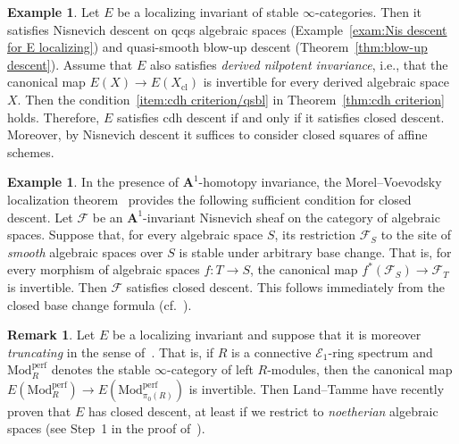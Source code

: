 \documentclass[11pt]{article}
\theoremstyle{definition}
\newtheorem{exam}[theo]{Example}
\newtheorem{rema}[theo]{Remark}
\numberwithin{equation}{section}
\numberwithin{figure}{section}
\numberwithin{table}{section}
\newcommand{\sE}{\ensuremath{\mathcal{E}}\xspace}
\newcommand{\sF}{\ensuremath{\mathcal{F}}\xspace}
\newcommand{\bA}{\ensuremath{\mathbf{A}}\xspace}
\newcommand{\Mod}{\mrm{Mod}}
\newcommand{\perf}{{\mrm{perf}}}
\newcommand{\A}{\bA}
\newcommand{\cl}{{\mrm{cl}}}
\newcommand{\mrm}[1]{\ensuremath{\mathrm{#1}}\xspace}
\begin{document}
\begin{exam}\label{exam:cdh=localizing+nil+closed}
Let $E$ be a localizing invariant of stable $\infty$-categories. Then it satisfies Nisnevich descent on qcqs algebraic spaces (Example~\ref{exam:Nis descent for E localizing}) and quasi-smooth blow-up descent (Theorem~\ref{thm:blow-up descent}). Assume that $E$ also satisfies \emph{derived nilpotent invariance}, i.e., that the canonical map $E(X) \to E(X_\cl)$ is invertible for every derived algebraic space $X$. Then the condition~\eqref{item:cdh criterion/qsbl} in Theorem~\ref{thm:cdh criterion} holds. Therefore, $E$ satisfies cdh descent if and only if it satisfies closed descent. Moreover, by Nisnevich descent it suffices to consider closed squares of affine schemes.
\end{exam}

\begin{exam}\label{exam:A1 closed}
In the presence of $\A^1$-homotopy invariance, the Morel--Voevodsky localization theorem~\cite[Theorem~3.2.21]{MorelVoevodsky} provides the following sufficient condition for closed descent. Let $\sF$ be an $\A^1$-invariant Nisnevich sheaf on the category of algebraic spaces. Suppose that, for every algebraic space $S$, its restriction $\sF_S$ to the site of \emph{smooth} algebraic spaces over $S$ is stable under arbitrary base change. That is, for every morphism of algebraic spaces $f : T \to S$, the canonical map $f^*(\sF_S) \to \sF_T$ is invertible. Then $\sF$ satisfies closed descent. This follows immediately from the closed base change formula (cf.~\cite[Proposition~3.3.2]{KhanLocalization}).
\end{exam}

\begin{rema}
Let $E$ be a localizing invariant and suppose that it is moreover \emph{truncating} in the sense of~\cite{LandTamme}. That is, if $R$ is a connective $\sE_1$-ring spectrum and $\Mod_R^\perf$ denotes the stable $\infty$-category of left $R$-modules, then the canonical map $E(\Mod^\perf_R) \to E(\Mod^\perf_{\pi_0(R)})$ is invertible. Then Land--Tamme have recently proven that $E$ has closed descent, at least if we restrict to \emph{noetherian} algebraic spaces (see Step~1 in the proof of~\cite[Theorem.~A.2]{LandTamme}).
\end{rema}
\end{document}
